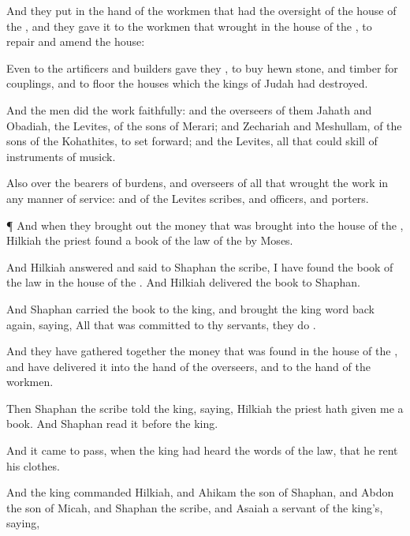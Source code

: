 {And they
put
{} in the
hand of the
workmen that had the
oversight of the
house of the
{}, and they
gave it to the
workmen that
wrought in the
house of the
{}, to
repair and
amend the
house:

Even to the
artificers and
builders
gave they
{}, to
buy
hewn
stone, and
timber for
couplings, and to
floor the
houses which the
kings of
Judah had
destroyed.

And the
men
did the
work
faithfully: and the
overseers of them
{}
Jahath and
Obadiah, the
Levites, of the
sons of
Merari; and
Zechariah and
Meshullam, of the sons of the
Kohathites, to set
{}
forward; and
{} the
Levites, all that could
skill of
instruments of
musick.

Also
{} over the bearers of
burdens, and
{}
overseers of all that
wrought the
work in any manner of
service: and of the
Levites
{}
scribes, and
officers, and
porters.


\par }{\PP {}¶ And when they brought
out the
money that was brought
into the
house of the
{},
Hilkiah the
priest
found a
book of the
law of the
{}
{}
by
Moses.

And
Hilkiah
answered and
said to
Shaphan the
scribe, I have
found the
book of the
law in the
house of the
{}. And
Hilkiah
delivered the
book to
Shaphan.

And
Shaphan
carried the
book to the
king, and
brought the
king
word
back again,
saying, All that was
committed
to thy
servants, they
do
{}.

And they have gathered
together the
money that was
found in the
house of the
{}, and have
delivered it into the
hand of the
overseers, and to the
hand of the
workmen.

Then
Shaphan the
scribe
told the
king,
saying,
Hilkiah the
priest hath
given me a
book. And
Shaphan
read it
before the
king.

And it came to pass, when the
king had
heard the
words of the
law, that he
rent his
clothes.

And the
king
commanded
Hilkiah, and
Ahikam the
son of
Shaphan, and
Abdon the
son of
Micah, and
Shaphan the
scribe, and
Asaiah a
servant of the
king’s,
saying,

}
